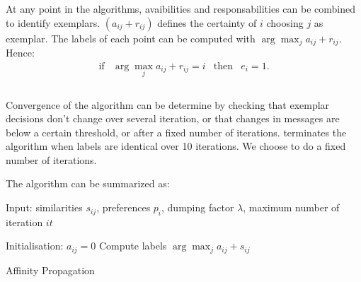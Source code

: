 \documentclass{ipol}
\begin{document}
At any point in the algorithms, avaibilities and responsabilities can be
combined to identify exemplars. $(a_{ij} + r_{ij})$ defines the certainty of
$i$ choosing $j$ as exemplar. The labels of each point can be computed with
$\arg \max_j a_{ij} + r_{ij}$. Hence:
\begin{equation*}
\begin{array}{cccc}
\text{if} & \arg \max_j a_{ij} + r_{ij} = i & \text{then} & e_i = 1. \\
\end{array}
\end{equation*}
\\

Convergence of the algorithm can be determine by checking that exemplar
decisions don't change over several iteration, or that changes in messages are
below a certain threshold, or after a fixed number of iterations.
\cite{frey07affinitypropagation} terminates the algorithm when labels are
identical over 10 iterations. We choose to do a fixed number of iterations.

The algorithm can be summarized as:
\begin{algorithm}[h]
  \SetLine
  Input: similarities $s_{ij}$, preferences $p_i$, dumping factor $\lambda$, 
  maximum number of iteration $it$\;

  Initialisation: $a_{ij} = 0$\;
  Compute labels $\arg \max_{j} a_{ij} + s_{ij}$ \;
  \caption{Affinity Propagation}
\end{algorithm}
\end{document}
